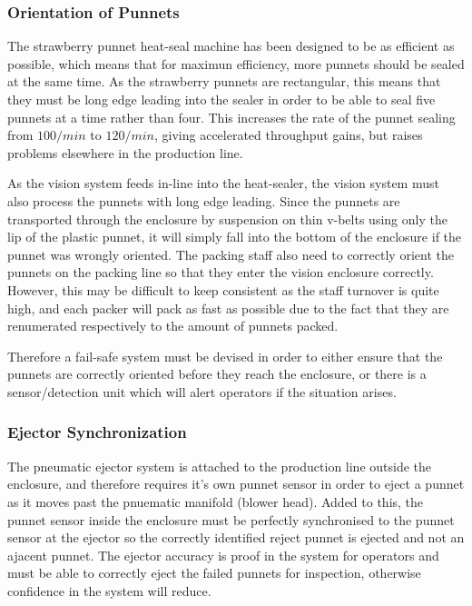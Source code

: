\documentclass[fleqn,twoside]{article}
\begin{document}
\subsubsection{Orientation of Punnets}

The strawberry punnet heat-seal machine has been designed to be as efficient as possible, which means that for maximun efficiency, more punnets should be sealed at the same time. As the strawberry punnets are rectangular, this means that they must be long edge leading into the sealer in order to be able to seal five punnets at a time rather than four. This increases the rate of the punnet sealing from $100/min$ to $120/min$, giving accelerated throughput gains, but raises problems elsewhere in the production line. 

As the vision system feeds in-line into the heat-sealer, the vision system must also process the punnets with long edge leading. Since the punnets are transported through the enclosure by suspension on thin v-belts using only the lip of the plastic punnet, it will simply fall into the bottom of the enclosure if the punnet was wrongly oriented. The packing staff also need to correctly orient the punnets on the packing line so that they enter the vision enclosure correctly. However, this may be difficult to keep consistent as the staff turnover is quite high, and each packer will pack as fast as possible due to the fact that they are renumerated respectively to the amount of punnets packed.

Therefore a fail-safe system must be devised in order to either ensure that the punnets are correctly oriented before they reach the enclosure, or there is a sensor/detection unit which will alert operators if the situation arises.


\subsubsection{Ejector Synchronization}

The pneumatic ejector system is attached to the production line outside the enclosure, and therefore requires it's own punnet sensor in order to eject a punnet as it moves past the pnuematic manifold (blower head). Added to this, the punnet sensor inside the enclosure must be perfectly synchronised to the punnet sensor at the ejector so the correctly identified reject punnet is ejected and not an ajacent punnet. The ejector accuracy is proof in the system for operators and must be able to correctly eject the failed punnets for inspection, otherwise confidence in the system will reduce.
\end{document}
